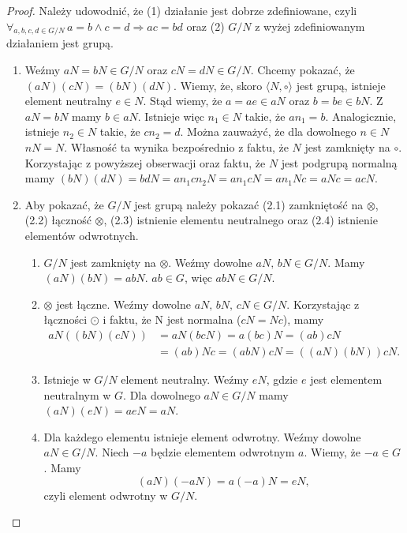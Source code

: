 \documentclass[polish,declaration,shortabstract]{iithesis}
\theoremstyle{definition}
\theoremstyle{remark} \newtheorem{observation}{Obserwacja}
\theoremstyle{plain} \newtheorem{theorem}{Twierdzenie}
\theoremstyle{plain} \newtheorem{lemma}{Lemat}
\theoremstyle{remark} \newtheorem*{remark*}{Uwaga}
\theoremstyle{reminder} \newtheorem*{reminder*}{Przypomnienie}
\begin{document}
\begin{proof}
	Należy udowodnić, że (1) działanie jest dobrze zdefiniowane, czyli $\forall_{a, b, c, d \in G/N} \, a = b \wedge c = d \Rightarrow ac = bd$ oraz (2) $G/N$ z wyżej zdefiniowanym działaniem jest grupą.\newline
	\begin{enumerate}[label={(\arabic*)}, leftmargin=.4in]
		\item Weźmy $aN = bN \in G/N$ oraz $cN = dN \in G/N$. Chcemy pokazać, że $(aN)(cN) = (bN)(dN)$. Wiemy, że, skoro $\langle N, \circ \rangle$ jest grupą, istnieje element neutralny $e \in N$. Stąd wiemy, że $a = ae \in aN$ oraz $b = be \in bN$. Z $aN = bN$ mamy $b \in aN$. Istnieje więc $n_1 \in N$ takie, że $an_1 = b$. Analogicznie, istnieje $n_2 \in N$ takie, że $cn_2 = d$.\newline
		      \newline
		      Można zauważyć, że dla dowolnego $n \in N$ $nN = N$. Własność ta wynika bezpośrednio z faktu, że $N$ jest zamknięty na $\circ$.\newline
		      \newline
		      Korzystając z powyższej obserwacji oraz faktu, że $N$ jest podgrupą normalną mamy $(bN)(dN) = bdN = an_1cn_2N = an_1cN = an_1Nc = aNc = acN$.\newline
		\item Aby pokazać, że $G/N$ jest grupą należy pokazać (2.1) zamkniętość na $\otimes$, (2.2) łączność $\otimes$, (2.3) istnienie elementu neutralnego oraz (2.4) istnienie elementów odwrotnych.
		      \begin{enumerate}[label=(2.\arabic*)]
		      	\item $G/N$ jest zamknięty na $\otimes$. Weźmy dowolne $aN, \, bN \in G/N$. Mamy $(aN)(bN) = abN$. $ab \in G$, więc $abN \in G/N$.
		      	\item $\otimes$ jest łączne. Weźmy dowolne $aN, \, bN, \, cN \in G/N$. Korzystając z łączności $\odot$ i faktu, że N jest normalna ($cN = Nc$), mamy 
		      	      \begin{align}
		      	      	aN((bN)(cN)) & = aN(bcN) = a(bc)N = (ab)cN        \\
		      	      	             & = (ab)Nc = (abN)cN = ((aN)(bN))cN. 
		      	      \end{align}
		      	\item Istnieje w $G/N$ element neutralny. Weźmy $eN$, gdzie $e$ jest elementem neutralnym w $G$. Dla dowolnego $aN \in G/N$ mamy $(aN)(eN) = aeN = aN$.
		      	\item Dla każdego elementu istnieje element odwrotny. Weźmy dowolne $aN \in G/N$. Niech $-a$ będzie elementem odwrotnym $a$. Wiemy, że $-a \in G$. Mamy \[(aN)(-aN) = a(-a)N = eN,\] czyli element odwrotny w $G/N$.
		      \end{enumerate}
	\end{enumerate}
\end{proof}
\end{document}
